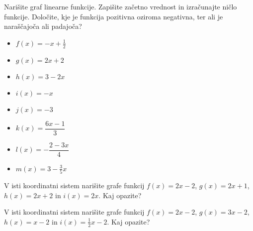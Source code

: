         
            \begin{naloga}
                Narišite graf linearne funkcije. Zapišite začetno vrednost in izračunajte ničlo funkcije.
                Določite, kje je funkcija pozitivna oziroma negativna, ter ali je naraščajoča ali padajoča?
                \begin{multicols}{2}    
                \begin{itemize}
                        \item $f(x)=-x+\frac{1}{2}$ 
                        \item $g(x)=2x+2$ 
                        \item $h(x)=3-2x$ 
                        \item $i(x)=-x$ 
                        \item $j(x)=-3$ 
                        \item $k(x)=\dfrac{6x-1}{3}$ 
                        \item $l(x)=-\dfrac{2-3x}{4}$ 
                        \item $m(x)=3-\frac{3}{5}x$ 
                    \end{itemize}
                \end{multicols}
            \end{naloga}
        


        
            \begin{naloga}
                V isti koordinatni sistem narišite grafe funkcij $f(x)=2x-2$, $g(x)=2x+1$, $h(x)=2x+2$ in $i(x)=2x$.
                Kaj opazite? 
            \end{naloga}

            \begin{naloga}
                V isti koordinatni sistem narišite grafe funkcij $f(x)=2x-2$, $g(x)=3x-2$, $h(x)=x-2$ in $i(x)=\frac{1}{2}x-2$.
                Kaj opazite? 
            \end{naloga}

        


    


